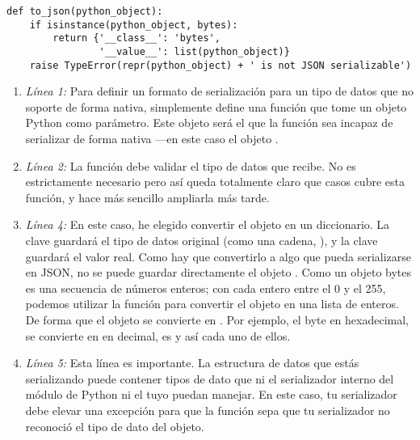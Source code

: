 \noindent\begin{minipage}{\textwidth}
\begin{lstlisting}[mathescape=True]
def to_json(python_object):            
    if isinstance(python_object, bytes):
        return {'__class__': 'bytes',
                '__value__': list(python_object)}
    raise TypeError(repr(python_object) + ' is not JSON serializable')
\end{lstlisting}
\end{minipage}

\begin{enumerate}

\item \emph{Línea 1:} Para definir un formato de serialización para un tipo de datos que  no soporte de forma nativa, simplemente define una función que tome un objeto Python como parámetro. Este objeto será el que la función  sea incapaz de serializar de forma nativa ---en este caso el objeto .

\item \emph{Línea 2:} La función debe validar el tipo de datos que recibe. No es estrictamente necesario pero así queda totalmente claro que casos cubre esta función, y hace más sencillo ampliarla más tarde.

\item \emph{Línea 4:} En este caso, he elegido convertir el objeto  en un diccionario. La clave  guardará el tipo de datos original (como una cadena, ), y la clave  guardará el valor real. Como hay que convertirlo a algo que pueda serializarse en JSON, no se puede guardar directamente el objeto . Como un objeto bytes es una secuencia de números enteros; con cada entero entre el 0 y el 255, podemos utilizar la función  para convertir el objeto  en una lista de enteros. De forma que el objeto  se convierte en \codigo{[222, 213, 180, 248]}. Por ejemplo, el byte  en hexadecimal, se convierte en  en decimal,  es  y así cada uno de ellos.

\item \emph{Línea 5:} Esta línea es importante. La estructura de datos que estás serializando puede contener tipos de dato que ni el serializador interno del módulo de Python ni el tuyo puedan manejar. En este caso, tu serializador debe elevar una excepción  para que la función  sepa que tu serializador no reconoció el tipo de dato del objeto.

\end{enumerate}

